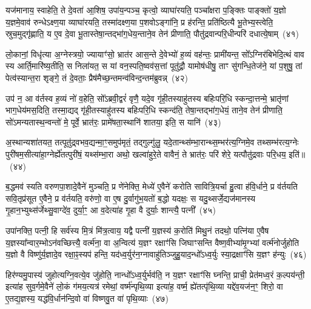 यज॑मानाय॒ स्वाहेति॒ ते दे॒वता॑ आ॒शिष॒ उपा॑य॒न्पञ्च॒ कृत्वो॒ व्याघा॑रयति॒ पञ्चा᳚क्षरा प॒ङ्क्तिः पाङ्क्तो॑ य॒ज्ञो य॒ज्ञमे॒वाव॑ रुन्धे\-ऽक्ष्ण॒या व्याघा॑रयति॒ तस्मा॑दक्ष्ण॒या प॒शवो\-ऽङ्गा॑नि॒ प्र ह॑रन्ति॒ प्रति॑ष्ठित्यै भू॒तेभ्य॒स्त्वेति॒ स्रुच॒मुद्गृ॑ह्णाति॒ य ए॒व दे॒वा भू॒तास्तेषा॒न्तद्भा॑ग॒धेय॒न्ताने॒व तेन॑ प्रीणाति॒ पौतु॑द्रवान्परि॒धीन्परि॑ दधात्ये॒षाम्~(४१)\ip

लो॒कानां॒ विधृ॑त्या अ॒ग्नेस्त्रयो॒ ज्यायाꣳ॑सो॒ भ्रात॑र आस॒न्ते दे॒वेभ्यो॑ ह॒व्यं वह॑न्तः॒ प्रामी॑यन्त॒ सो᳚\-ऽग्निर॑बिभेदि॒त्थं वाव स्य आर्ति॒मारि॑ष्य॒तीति॒ स निला॑यत॒ स यां वन॒स्पति॒ष्वव॑स॒त्तां पूतु॑द्रौ॒ यामोष॑धीषु॒ ताꣳ सु॑गन्धि॒तेज॑ने॒ यां प॒शुषु॒ तां पेत्व॑स्यान्त॒रा शृङ्गे॒ तं दे॒वताः॒ प्रैष॑मैच्छ॒न्तमन्व॑विन्द॒न्तम॑ब्रुवन्न्~(४२)\ip

उप॑ न॒ आ व॑र्तस्व ह॒व्यं नो॑ व॒हेति॒ सो᳚\-ऽब्रवी॒द्वरं॑ वृणै॒ यदे॒व गृ॑ही॒तस्याहु॑तस्य बहिःपरि॒धि स्कन्दा॒त्तन्मे॒ भ्रातृ॑णां भाग॒\-धेय॑मस॒दिति॒ तस्मा॒द्यद् गृ॑ही॒तस्याहु॑तस्य बहिःपरि॒धि स्कन्द॑ति॒ तेषा॒न्तद्भा॑ग॒धेयं॒ ताने॒व तेन॑ प्रीणाति॒ सो॑\-ऽमन्यतास्थ॒न्वन्तो॑ मे॒ पूर्वे॒ भ्रात॑रः॒ प्रामे॑षता॒स्थानि॑ शातया॒ इति॒ स यानि॑~(४३)\ip

अ॒स्थान्यशा॑तयत॒ तत्पूतु॑द्र्वभव॒द्यन्मा॒ꣳ॒समुप॑मृतं॒ तद्गुल्गु॑लु॒ यदे॒तान्थ्स॑म्भा॒रान्थ्स॒म्भर॑त्य॒ग्निमे॒व तथ्सम्भ॑रत्य॒ग्नेः पुरी॑षम॒सीत्या॑हा॒ग्नेर्\mbox{}ह्ये॑तत्पुरी॑षं॒ यथ्स॑म्भा॒रा अथो॒ खल्वा॑हुरे॒ते वावैनं॒ ते भ्रात॑रः॒ परि॑ शेरे॒ यत्पौतु॑द्रवाः परि॒धय॒ इति॑॥~(४४)\ip

{\anuvakamend[{वि॒त्त्वा दे॑वय॒त ए॒षाम॑ब्रुव॒न्॒ यानि॒ चतु॑श्चत्वारिꣳशच्च}]}

ब॒द्धमव॑ स्यति वरुणपा॒शादे॒वैने॑ मुञ्चति॒ प्र णे॑नेक्ति॒ मेध्ये॑ ए॒वैने॑ करोति सावित्रि॒यर्चा हु॒त्वा ह॑वि॒र्धाने॒ प्र व॑र्तयति सवि॒तृप्र॑सूत ए॒वैने॒ प्र व॑र्तयति॒ वरु॑णो॒ वा ए॒ष दु॒र्वागु॑भ॒यतो॑ ब॒द्धो यदक्षः॒ स यदु॒थ्सर्जे॒द्यज॑मानस्य गृ॒हान॒भ्युथ्स॑र्जेथ्सु॒वाग्दे॑व॒ दुर्या॒ꣳ॒ आ व॒देत्या॑ह गृ॒हा वै दुर्याः॒ शान्त्यै॒ पत्नी᳚~(४५)\ip

उपा॑नक्ति॒ पत्नी॒ हि सर्व॑स्य मि॒त्रं मि॑त्र॒त्वाय॒ यद्वै पत्नी॑ य॒ज्ञस्य॑ क॒रोति॑ मिथु॒नं तदथो॒ पत्नि॑या ए॒वैष य॒ज्ञस्या᳚न्वार॒म्भो\-ऽन॑वच्छित्त्यै॒ वर्त्म॑ना॒ वा अ॒न्वित्य॑ य॒ज्ञꣳ रक्षाꣳ॑सि जिघाꣳसन्ति वैष्ण॒वीभ्या॑मृ॒ग्भ्यां वर्त्म॑नोर्जुहोति य॒ज्ञो वै विष्णु॑र्य॒ज्ञादे॒व रक्षा॒ꣴ॒स्यप॑ हन्ति॒ यद॑ध्व॒र्युर॑न॒ग्नावाहु॑तिञ्जुहु॒याद॒न्धो᳚\-ऽध्व॒र्युः स्या॒द्रक्षाꣳ॑सि य॒ज्ञꣳ ह॑न्युः~(४६)\ip

हिर॑ण्यमु॒पास्य॑ जुहोत्यग्नि॒वत्ये॒व जु॑होति॒ नान्धो᳚\-ऽध्व॒र्युर्भव॑ति॒ न य॒ज्ञꣳ रक्षाꣳ॑सि घ्नन्ति॒ प्राची॒ प्रेत॑मध्व॒रं क॒ल्पय॑न्ती॒ इत्या॑ह सुव॒र्गमे॒वैने॑ लो॒कं ग॑मय॒त्यत्र॑ रमेथां॒ वर्ष्म॑न्पृथि॒व्या इत्या॑ह॒ वर्ष्म॒ ह्ये॑तत्पृ॑थि॒व्या यद्दे॑व॒यज॑न॒ꣳ॒ शिरो॒ वा ए॒तद्य॒ज्ञस्य॒ यद्ध॑वि॒र्धान॑न्दि॒वो वा॑ विष्णवु॒त वा॑ पृथि॒व्याः~(४७)\ip

